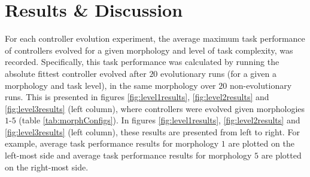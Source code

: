 \documentclass[conference]{IEEEtran}
\begin{document}


\section{Results \& Discussion}

For each controller evolution experiment, the average maximum task performance
of controllers evolved for a given morphology and level of task complexity, was recorded.
Specifically, this task performance was calculated by running the absolute fittest controller
evolved after $20$ evolutionary runs (for a given a morphology and task level),
in the same morphology over $20$ non-evolutionary runs.
This is presented in figures \ref{fig:level1results}, \ref{fig:level2results} and \ref{fig:level3results}
(left column), where controllers were evolved given morphologies $1$-$5$ (table \ref{tab:morphConfigs}).
In figures \ref{fig:level1results}, \ref{fig:level2results} and \ref{fig:level3results} (left column),
these results are presented from left to right.
For example, average task performance results for morphology $1$ are plotted on the left-most side
and average task performance results for morphology $5$ are plotted on the right-most side.
\end{document}

